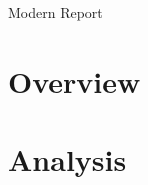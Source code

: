 \documentclass[12pt]{article}
\begin{document}
{\Huge\color{primary} Modern Report}

\vspace{1cm}

\section*{Overview}
\lipsum[1]

\section*{Analysis}
\lipsum[2-3]
\end{document}
